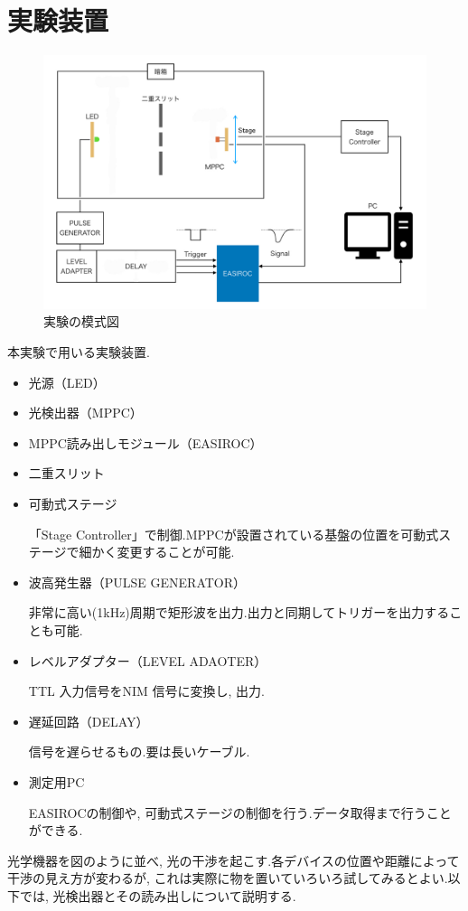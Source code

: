 
\section{実験装置}
\begin{figure}[h]
  \begin{center}
    \includegraphics[width=12cm]{setup_2021.jpeg}
  \end{center}
  \caption{実験の模式図}
\end{figure}

本実験で用いる実験装置.
\begin{itemize}
  \item 光源（LED）
  \item 光検出器（MPPC）
  \item MPPC読み出しモジュール（EASIROC）
  \item 二重スリット
  \item 可動式ステージ\par
        「Stage Controller」で制御.MPPCが設置されている基盤の位置を可動式ステージで細かく変更することが可能.
  \item 波高発生器（PULSE GENERATOR）\par
        非常に高い(1kHz)周期で矩形波を出力.出力と同期してトリガーを出力することも可能.
  \item レベルアダプター（LEVEL ADAOTER）\par
        TTL 入力信号をNIM 信号に変換し, 出力.
  \item 遅延回路（DELAY）\par
        信号を遅らせるもの.要は長いケーブル.
  \item 測定用PC \par
        EASIROCの制御や, 可動式ステージの制御を行う.データ取得まで行うことができる.
\end{itemize}
光学機器を図のように並べ, 光の干渉を起こす.各デバイスの位置や距離によって干渉の見え方が変わるが, これは実際に物を置いていろいろ試してみるとよい.以下では, 光検出器とその読み出しについて説明する.

